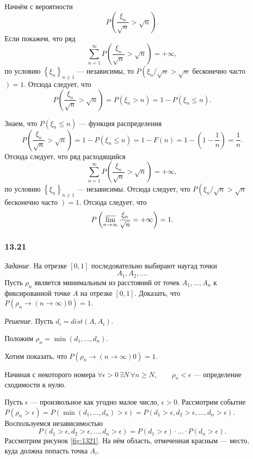 Начнём с вероятности
$$P \left( \frac{ \xi_n}{ \sqrt{n}} > \sqrt{n} \right).$$
Если покажем, что ряд
$$ \sum \limits_{n=1}^{ \infty } P \left( \frac{ \xi_n}{ \sqrt{n}} > \sqrt{n} \right) =
+ \infty,$$
по условию $ \left\{ \xi_n \right\}_{n \geq 1}$ --- независимы, то $P \left( \xi_n / \sqrt{n} > \sqrt{n} \right.$ бесконечно часто $ \left. \right) = 1$.
Отсюда следует, что
$$P \left( \frac{ \xi_n}{ \sqrt{n}} > \sqrt{n} \right) = P \left( \xi_n > n \right) = 1 - P \left( \xi_n \leq n \right).$$

Знаем, что $P \left( \xi_n \leq n \right) $ --- функция распределения
$$P \left( \frac{ \xi_n}{ \sqrt{n}} > \sqrt{n} \right) =
1 - P \left( \xi_n \leq n \right) =
1 - F \left( n \right) =
1 - \left( 1 - \frac{1}{n} \right) =
\frac{1}{n}.$$
Отсюда следует, что ряд расходящийся
$$ \sum \limits_{n=1}^{ \infty } P \left( \frac{ \xi_n}{ \sqrt{n}} > \sqrt{n} \right) =
+ \infty,$$
по условию $ \left\{ \xi_n \right\}_{n \geq 1}$ --- независимы.
Отсюда следует, что $P \left( \xi_n / \sqrt{n} > \sqrt{n} \right.$ бесконечно часто $ \left. \right) = 1$.
Отсюда следует, что
$$P \left( \varlimsup \limits_{n \to \infty } \frac{ \xi_n}{ \sqrt{n}} =
+ \infty \right) =
1.$$

\subsubsection*{13.21}

\textit{Задание.} На отрезке $ \left[ 0, 1 \right] $ последовательно выбирают наугад точки
$$A_1, A_2, \dotsc.$$
Пусть $ \rho_n$ является минимальным из расстояний от точек $A_1, \dotsc, A_n$ к фиксированной точке $A$ на отрезке $ \left[ 0, 1 \right] $.
Доказать, что $P \left( \rho_n \to \left( n \to \infty \right) 0 \right) = 1$.

\textit{Решение.} Пусть $d_i = dist \left( A, A_i \right) $.

Положим $ \rho_n = \min \left( d_1, \dotsc, d_n \right) $.

Хотим показать, что $P \left( \rho_n \to \left( n \to \infty \right) 0 \right) = 1$.

Начиная с некоторого номера $ \forall \epsilon > 0 \, \exists N \, \forall n \geq N, \qquad \rho_n < \epsilon $ --- определение сходимости к нулю.

Пусть $ \epsilon $ --- произвольное как угодно малое число, $ \epsilon > 0$.
Рассмотрим событие
$P \left( \rho_n > \epsilon \right) =
P \left( \min \left( d_1, \dotsc, d_n \right) > \epsilon \right) =
P \left( d_1 > \epsilon, d_2 > \epsilon, \dotsc, d_n > \epsilon \right) $.
Воспользуемся независимостью
$$P \left( d_1 > \epsilon, d_2 > \epsilon, \dotsc, d_n > \epsilon \right) =
P \left( d_1 > \epsilon \right) \cdot \dotsc \cdot P \left( d_n > \epsilon \right).$$
Рассмотрим рисунок \ref{fig:1321}.
На нём область, отмеченная красным --- место, куда должна попасть точка $A_i$.

